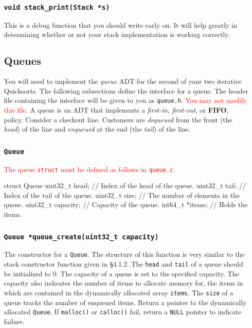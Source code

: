 \documentclass[11pt]{article}
\begin{document}
\subsubsection{\texttt{void stack\_print(Stack *s)}}

This is a debug function that you should write early on. It will help
greatly in determining whether or not your stack implementation is
working correctly.


\subsection{Queues}

You will need to implement the \emph{queue} ADT for the second of your
two iterative Quicksorts. The following subsections define the interface
for a queue. The header file containing the interface will be given to
you as \texttt{queue.h}. \textcolor{red}{You may not modify this file.}
A queue is an ADT that implements a \emph{first-in, first-out}, or
\textbf{FIFO}, policy. Consider a checkout line. Customers are
\emph{dequeued} from the front (the \emph{head}) of the line and
\emph{enqueued} at the end (the \emph{tail}) of the line.

\subsubsection{\texttt{Queue}}

\textcolor{red}{The queue \texttt{struct} must be defined as follows in
\texttt{queue.c}:}

\begin{codelisting}{}
struct Queue {
  uint32_t head;      // Index of the head of the queue.
  uint32_t tail;      // Index of the tail of the queue.
  uint32_t size;      // The number of elements in the queue.
  uint32_t capacity;  // Capacity of the queue.
  int64_t *items;     // Holds the items.
}
\end{codelisting}

\subsubsection{\texttt{Queue *queue\_create(uint32\_t capacity)}}

The constructor for a \texttt{Queue}. The structure of this function is
very similar to the stack constructor function given in \S 4.1.2. The
\texttt{head} and \texttt{tail} of a queue should be initialized to 0.
The capacity of a queue is set to the specified capacity. The capacity
also indicates the number of items to allocate memory for, the items in
which are contained in the dynamically allocated array \texttt{items}.
The \texttt{size} of a queue tracks the number of enqueued items.
Return a pointer to the dynamically allocated \texttt{Queue}. If
\texttt{malloc()} or \texttt{calloc()} fail, return a \texttt{NULL}
pointer to indicate failure.
\end{document}
